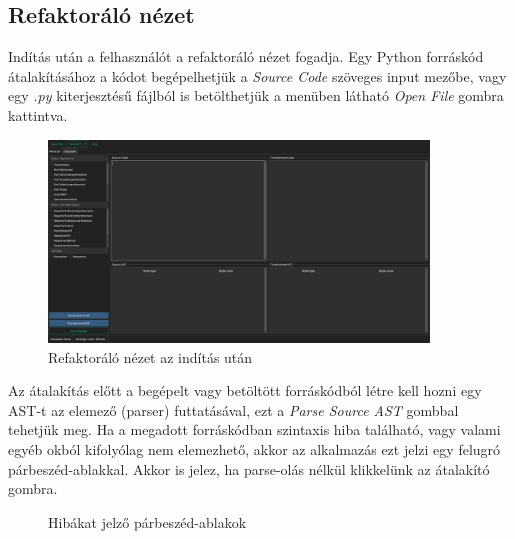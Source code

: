\subsection{Refaktoráló nézet}

Indítás után a felhasználót a refaktoráló nézet fogadja.
Egy Python forráskód átalakításához a kódot begépelhetjük a \emph{Source Code} szöveges input mezőbe,
vagy egy \emph{.py} kiterjesztésű fájlból is betölthetjük a menüben látható \emph{Open File} gombra kattintva.

\begin{figure}[H]
	\centering
	\includegraphics[width=0.9\textwidth]{images/screenshots/refactor_tab_1.png}
	\caption{Refaktoráló nézet az indítás után}
\end{figure}

Az átalakítás előtt a begépelt vagy betöltött forráskódból létre kell hozni egy AST-t
az elemező (parser) futtatásával,
ezt a \emph{Parse Source AST} gombbal tehetjük meg. Ha a megadott forráskódban szintaxis hiba található, 
vagy valami egyéb okból kifolyólag nem elemezhető, akkor az alkalmazás ezt jelzi egy felugró 
párbeszéd-ablakkal. Akkor is jelez, ha parse-olás nélkül klikkelünk az átalakító gombra.

\begin{figure}[H]
	\centering
	\hspace{5pt}
	\caption{Hibákat jelző párbeszéd-ablakok}
\end{figure}

